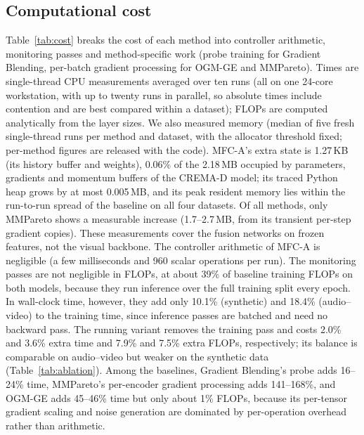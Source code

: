 \documentclass[fleqn,10pt]{wlscirep}
\begin{document}
\subsection*{Computational cost}
Table~\ref{tab:cost} breaks the cost of each method into controller arithmetic, monitoring passes and method-specific work (probe training for Gradient Blending, per-batch gradient processing for OGM-GE and MMPareto). Times are single-thread CPU measurements averaged over ten runs (all on one 24-core workstation, with up to twenty runs in parallel, so absolute times include contention and are best compared within a dataset); FLOPs are computed analytically from the layer sizes. We also measured memory (median of five fresh single-thread runs per method and dataset, with the allocator threshold fixed; per-method figures are released with the code). MFC-A's extra state is 1.27\,KB (its history buffer and weights), 0.06\% of the 2.18\,MB occupied by parameters, gradients and momentum buffers of the CREMA-D model; its traced Python heap grows by at most 0.005\,MB, and its peak resident memory lies within the run-to-run spread of the baseline on all four datasets. Of all methods, only MMPareto shows a measurable increase (1.7--2.7\,MB, from its transient per-step gradient copies). These measurements cover the fusion networks on frozen features, not the visual backbone. The controller arithmetic of MFC-A is negligible (a few milliseconds and 960 scalar operations per run). The monitoring passes are not negligible in FLOPs, at about 39\% of baseline training FLOPs on both models, because they run inference over the full training split every epoch. In wall-clock time, however, they add only 10.1\% (synthetic) and 18.4\% (audio--video) to the training time, since inference passes are batched and need no backward pass. The running variant removes the training pass and costs 2.0\% and 3.6\% extra time and 7.9\% and 7.5\% extra FLOPs, respectively; its balance is comparable on audio--video but weaker on the synthetic data (Table~\ref{tab:ablation}). Among the baselines, Gradient Blending's probe adds 16--24\% time, MMPareto's per-encoder gradient processing adds 141--168\%, and OGM-GE adds 45--46\% time but only about 1\% FLOPs, because its per-tensor gradient scaling and noise generation are dominated by per-operation overhead rather than arithmetic.
\end{document}
